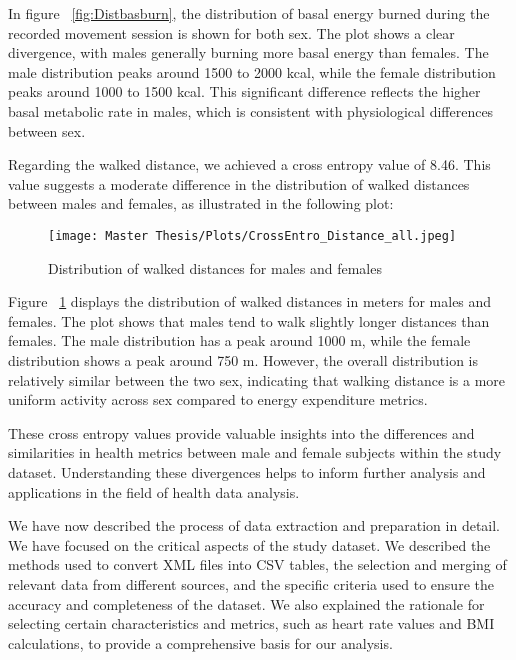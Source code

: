 In figure ~\ref{fig:Distbasburn}, the distribution of basal energy burned during the recorded movement session is shown for both sex. The plot shows a clear divergence, with males generally burning more basal energy than females. The male distribution peaks around 1500 to 2000 kcal, while the female distribution peaks around 1000 to 1500 kcal. This significant difference reflects the higher basal metabolic rate in males, which is consistent with physiological differences between sex.

Regarding the walked distance, we achieved a cross entropy value of 8.46. This value suggests a moderate difference in the distribution of walked distances between males and females, as illustrated in the following plot:

\FloatBarrier
\begin{figure}[h!]
\centering
\texttt{[image: Master Thesis/Plots/CrossEntro\_Distance\_all.jpeg]}
\caption{Distribution of walked distances for males and females}
\label{fig:distWalkedRun}
\end{figure}
\FloatBarrier

Figure ~\ref{fig:distWalkedRun} displays the distribution of walked distances in meters for males and females. The plot shows that males tend to walk slightly longer distances than females. The male distribution has a peak around 1000 m, while the female distribution shows a peak around 750 m. However, the overall distribution is relatively similar between the two sex, indicating that walking distance is a more uniform activity across sex compared to energy expenditure metrics.

These cross entropy values provide valuable insights into the differences and similarities in health metrics between male and female subjects within the study dataset. Understanding these divergences helps to inform further analysis and applications in the field of health data analysis.

\newpage

We have now described the process of data extraction and preparation in detail. We have focused on the critical aspects of the study dataset. We described the methods used to convert XML files into CSV tables, the selection and merging of relevant data from different sources, and the specific criteria used to ensure the accuracy and completeness of the dataset. We also explained the rationale for selecting certain characteristics and metrics, such as heart rate values and BMI calculations, to provide a comprehensive basis for our analysis.